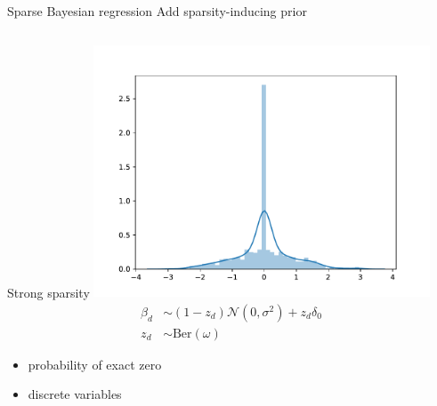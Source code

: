 \documentclass[9pt]{beamer}
\begin{document}
\begin{frame}{Sparse Bayesian regression}
  Add \alert{sparsity-inducing prior}
  \begin{columns}
    \begin{column}{0.5\textwidth}
      \centering
      \begin{block}{Strong sparsity}
        \includegraphics[width=0.75\textwidth]{sparse/strong_sparse}
        \begin{align*}
          \beta_d &\sim (1 - z_d) \mathcal{N}(0, \sigma^2) + z_d \delta_0 \\
          z_d & \sim \text{Ber}(\omega)
        \end{align*}
        \begin{itemize}
          \item probability of exact zero
          \item discrete variables
        \end{itemize}
      \end{block}
    \end{column}


\end{columns}
\end{frame}
\end{document}

